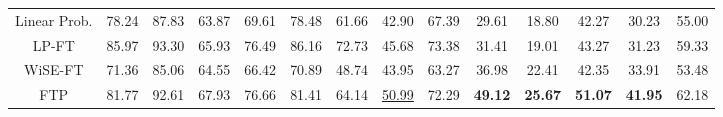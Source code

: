 \begin{table}[!h]
{\begin{tabular}{@{}c|cccccccc|cccc|c@{}}
        Linear Prob. &
          \multicolumn{1}{c|}{78.24} &
          87.83 &
          \multicolumn{1}{c|}{63.87} &
          \multicolumn{1}{c|}{69.61} &
          \multicolumn{1}{c|}{78.48} &
          \multicolumn{1}{c|}{61.66} &
          \multicolumn{1}{c|}{42.90} &
          67.39 &
          29.61 &
          18.80 &
          \multicolumn{1}{c|}{42.27}  &
          \multicolumn{1}{c|}{30.23} &
          55.00
          \\

        LP-FT &
          \multicolumn{1}{c|}{85.97}  &
          93.30 &
          \multicolumn{1}{c|}{65.93} &
          \multicolumn{1}{c|}{76.49} &
          \multicolumn{1}{c|}{86.16} &
          \multicolumn{1}{c|}{72.73} &
          \multicolumn{1}{c|}{45.68} &
          73.38 &
          31.41 &
          19.01 &
          \multicolumn{1}{c|}{43.27}  &
          \multicolumn{1}{c|}{31.23} &
          59.33
          \\

        WiSE-FT &
          \multicolumn{1}{c|}{71.36} &
          85.06 &
          \multicolumn{1}{c|}{64.55} &
          \multicolumn{1}{c|}{66.42} &
          \multicolumn{1}{c|}{70.89} &
          \multicolumn{1}{c|}{48.74} &
          \multicolumn{1}{c|}{43.95} &
          63.27 &
          36.98 &
          22.41 &
          \multicolumn{1}{c|}{42.35}  &
          \multicolumn{1}{c|}{33.91} &
          53.48
          \\


        FTP &
          \multicolumn{1}{c|}{81.77} &
          92.61 &
          \multicolumn{1}{c|}{67.93} &
          \multicolumn{1}{c|}{76.66} &
          \multicolumn{1}{c|}{81.41} &
          \multicolumn{1}{c|}{64.14} &
          \multicolumn{1}{c|}{\underline{50.99}} &
          72.29 &
          \textbf{49.12} &
          \textbf{25.67} &
          \multicolumn{1}{c|}{\textbf{51.07}}  &
          \multicolumn{1}{c|}{\textbf{41.95}} &
          62.18
          \\


\end{tabular}}
\end{table}
